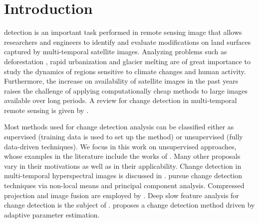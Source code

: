 \documentclass[journal]{IEEEtran}
\begin{document}
%
\IEEEpeerreviewmaketitle



\section{Introduction}
% 
% 
% 
% 

 detection is an important task performed in remote sensing image that allows researchers and engineers to identify and evaluate modifications on land surfaces captured by multi-temporal satellite images. Analyzing problems such as deforestation \cite{barreto2016deforestation}, rapid urbanization \cite{ban2012multitemporal} and glacier melting \cite{scher2021mapping} are of great importance to study the dynamics of regions sensitive to climate changes and human activity. Furthermore, the increase on availability of satellite images in the past years raises the challenge of applying computationally cheap methods to large images available over long periods. A review for change detection in multi-temporal remote sensing is given by \cite{ban2016change}.


Most methods used for change detection analysis can be classified either as supervised (training data is used to set up the method) or unsupervised (fully data-driven techniques). We focus in this work on unsupervised approaches, whose examples in the literature include the works of \cite{bruzzone2000automatic,celik2010change,quin2014mimosa,saha2020change,NegriEA2021,NegriFrery2021}. Many other proposals vary in their motivations as well as in their applicability.  Change detection in multi-temporal hyperspectral images is discussed in \cite{bovolo2015time,liu2019review,matsunaga2017current}.  \cite{jia2018novel} pursue change detection techniques via non-local means and principal component analysis. Compressed projection and image fusion are employed by \cite{hou2014unsupervised}. Deep slow feature analysis for change detection is the subject of \cite{du2019unsupervised}. \cite{chen2020change} proposes a change detection method driven by adaptive parameter estimation.
\end{document}
